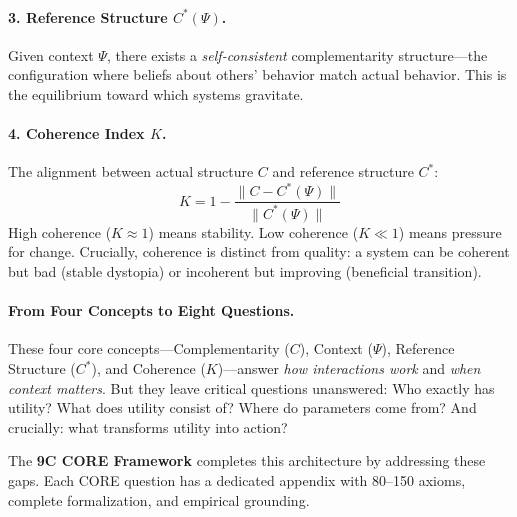 \paragraph{3. Reference Structure $C^*(\Psi)$.}
Given context $\Psi$, there exists a \emph{self-consistent} complementarity structure---the configuration where beliefs about others' behavior match actual behavior. This is the equilibrium toward which systems gravitate.

\paragraph{4. Coherence Index $K$.}
The alignment between actual structure $C$ and reference structure $C^*$:
\begin{equation}
    K = 1 - \frac{\|C - C^*(\Psi)\|}{\|C^*(\Psi)\|}
\end{equation}
High coherence ($K \approx 1$) means stability. Low coherence ($K \ll 1$) means pressure for change. Crucially, coherence is distinct from quality: a system can be coherent but bad (stable dystopia) or incoherent but improving (beneficial transition).

\paragraph{From Four Concepts to Eight Questions.}
\label{sec:intro-8c}
These four core concepts---Complementarity ($C$), Context ($\Psi$), Reference Structure ($C^*$), and Coherence ($K$)---answer \emph{how interactions work} and \emph{when context matters}. But they leave critical questions unanswered: Who exactly has utility? What does utility consist of? Where do parameters come from? And crucially: what transforms utility into action?

The \textbf{9C CORE Framework} completes this architecture by addressing these gaps. Each CORE question has a dedicated appendix with 80--150 axioms, complete formalization, and empirical grounding.

